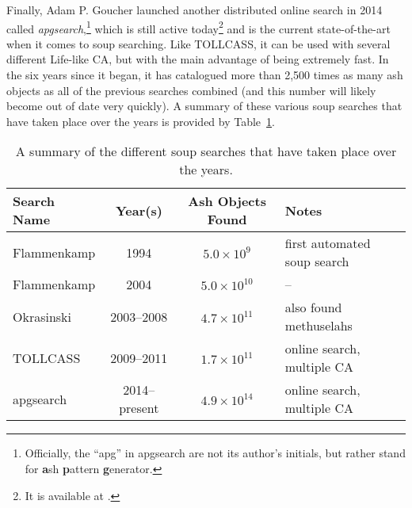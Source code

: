 Finally, Adam P. Goucher launched another distributed online search in 2014 called \emph{apgsearch},\footnote{Officially, the ``apg'' in apgsearch are not its author's initials, but rather stand for \textbf{a}sh \textbf{p}attern \textbf{g}enerator.} which is still active today\footnote{It is available at .} and is the current state-of-the-art when it comes to soup searching. Like TOLLCASS, it can be used with several different Life-like CA, but with the main advantage of being extremely fast. In the six years since it began, it has catalogued more than 2,500 times as many ash objects as all of the previous searches combined (and this number will likely become out of date very quickly). A summary of these various soup searches that have taken place over the years is provided by Table~\ref{tab:ash_searches}.

\begin{table}[!htb]\vspace*{0.05in}
	\begin{center}		
		\begin{tabular}{l c c l}
			\toprule
			Search Name & Year(s) & Ash Objects Found & Notes \\ \midrule
			Flammenkamp & 1994 & $5.0 \times 10^9$ & first automated soup search \\
			\rowcolor{gray!20} Flammenkamp & 2004 & $5.0 \times 10^{10}$ & -- \\
			Okrasinski & 2003--2008 & $4.7 \times 10^{11}$ & also found methuselahs \\
			\rowcolor{gray!20} TOLLCASS & 2009--2011 & $1.7 \times 10^{11}$ & online search, multiple CA \\
			apgsearch & 2014--present & $4.9 \times 10^{14}$ & online search, multiple CA \\
			\bottomrule
		\end{tabular}
		\caption{A summary of the different soup searches that have taken place over the years.}\label{tab:ash_searches}
	\end{center}
\end{table}


\filbreak


